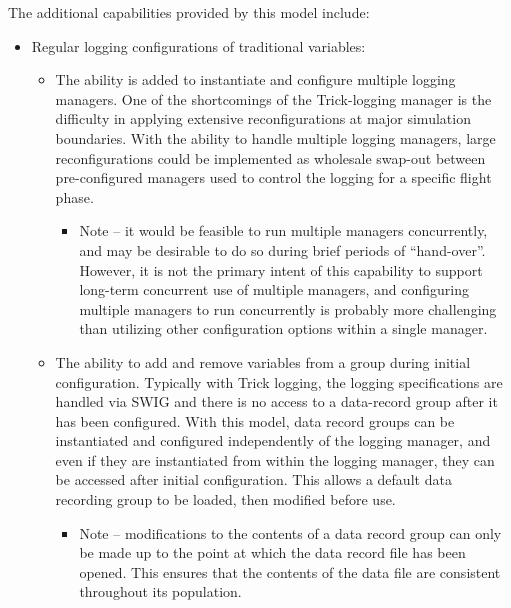 \documentclass[11pt,fleqn]{report}
\begin{document}
The additional capabilities provided by this model include:
\begin{itemize}
  \item Regular logging configurations of traditional variables:
  \begin{itemize}
    \item The ability is added to instantiate and configure multiple
          logging managers. One of the shortcomings of the Trick-logging
          manager is the difficulty in applying extensive reconfigurations
          at major simulation boundaries. With the ability to handle multiple
          logging managers, large reconfigurations could be implemented as
          wholesale swap-out between pre-configured managers used to control
          the logging for a specific flight phase.
    \begin{itemize}
      \item Note – it would be feasible to run multiple managers concurrently,
            and may be desirable to do so during brief periods of “hand-over”.
            However, it is not the primary intent of this capability to
            support long-term concurrent use of multiple managers, and
            configuring multiple managers to run concurrently is
            probably more challenging than utilizing other configuration
            options within a single manager.
    \end{itemize}
    \item The ability to add and remove variables from a group during
          initial configuration. Typically with Trick logging, the logging
          specifications are handled via SWIG and there is no access to a
          data-record group after it has been configured. With this model,
          data record groups can be instantiated and configured independently
          of the logging manager, and even if they are instantiated from
          within the logging manager, they can be accessed after initial
          configuration. This allows a default data recording group to be
          loaded, then modified before use.
    \begin{itemize}
      \item Note – modifications to the contents of a data record group
            can only be made up to the point at which the data record file
            has been opened.  This ensures that the contents of the data
            file are consistent throughout its population.
    \end{itemize}
  \end{itemize}

\end{itemize}
\end{document}
